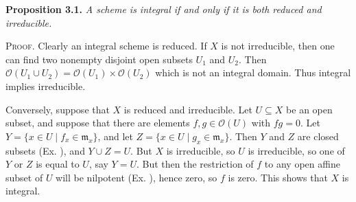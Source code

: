 {\smallskip
\noindent\hypertarget{result-II-3.1}{}\textbf{Proposition 3.1.} \emph{A scheme is integral if and only if it is both reduced and irreducible.}

\smallskip
\noindent\textsc{Proof.} Clearly an integral scheme is reduced. If $X$ is not irreducible, then one can find two nonempty disjoint open subsets $U_1$ and $U_2$. Then $\mathcal O(U_1\cup U_2)=\mathcal O(U_1)\times\mathcal O(U_2)$ which is not an integral domain. Thus integral implies irreducible.

Conversely, suppose that $X$ is reduced and irreducible. Let $U\subseteq X$ be an open subset, and suppose that there are elements $f,g\in\mathcal O(U)$ with $fg=0$. Let $Y=\{x\in U\mid f_x\in\mathfrak m_x\}$, and let $Z=\{x\in U\mid g_x\in\mathfrak m_x\}$. Then $Y$ and $Z$ are closed subsets (Ex. ), and $Y\cup Z=U$. But $X$ is irreducible, so $U$ is irreducible, so one of $Y$ or $Z$ is equal to $U$, say $Y=U$. But then the restriction of $f$ to any open affine subset of $U$ will be nilpotent (Ex. ), hence zero, so $f$ is zero. This shows that $X$ is integral.}
